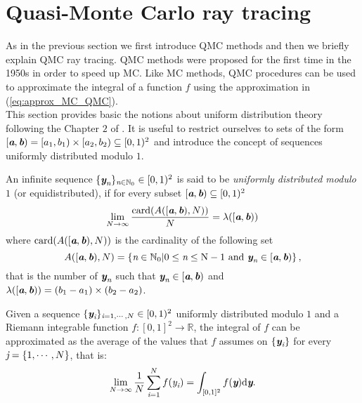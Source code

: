 \section{Quasi-Monte Carlo ray tracing}\label{sec:QMC}
As in the previous section we first introduce QMC methods and then we briefly explain QMC ray tracing. QMC methods were proposed for the first time in the 1950s in order to speed up MC. Like MC methods, QMC procedures can be used to approximate the integral of a function $f$ using the approximation in (\ref{eq:approx_MC_QMC}).\\ \indent
This section provides basic the notions about uniform distribution theory following the Chapter $2$ of \cite{leobacher2014introduction}. 
It is useful to restrict ourselves to sets of the form $[\textit{\textbf{a}}, \textit{\textbf{b}})= [a_1,b_1)\times[a_2, b_2)\subseteq[0,1)^2$ and introduce the concept of sequences uniformly distributed modulo $1$.
\begin{definition}
An infinite sequence $\{\textit{\textbf{y}}_{\textit{n}}\}_{\textit{n}\in\mathbb{N}_0} \in [0,1)^2$ is said to be \textit{uniformly distributed modulo $1$} (or equidistributed), if for every subset $[\textit{\textbf{a}},\textit{\textbf{b}})\subseteq[0,1)^2$
\begin{equation}
\lim_{N\rightarrow \infty}\frac{\textrm{card}(A([\textit{\textbf{a}},\textit{\textbf{b}}), N))}{N} = \lambda([\textit{\textbf{a}},\textit{\textbf{b}}))
\end{equation}
where $\textrm{card}(A([\textit{\textbf{a}},\textit{\textbf{b}}), N))$ is the cardinality of the following set
\begin{equation}
A([\textit{\textbf{a}},\textit{\textbf{b}}), N) = \{\textit{n}\in \mathbb{N}_0 | 0\leq\textit{n}\leq \textrm{N}-1 \mbox{ and } \textit{\textbf{y}}_{\textit{n}}\in [\textit{\textbf{a}},\textit{\textbf{b}})\}\,,
\end{equation} that is the number of $\textit{\textbf{y}}_{\textit{n}}$ such that $\textit{\textbf{y}}_{\textit{n}}\in [\textit{\textbf{a}},\textit{\textbf{b}})$ and $\lambda([\textit{\textbf{a}},\textit{\textbf{b}})) =(b_1-a_1)\times (b_2-a_2)$.
\end{definition}
Given a sequence $\{\textit{\textbf{y}}_{\textit{i}}\}_{\textit{i} = 1, \cdots, N}\in[0,1)^2$ uniformly distributed modulo $1$ and a 
Riemann integrable function $f:[0,1]^2\rightarrow \mathbb{R}$, the integral of $f$ can be approximated as the average of the values that $f$ assumes on $\{\textit{\textbf{y}}_{\textit{i}}\}$ for every $\textit{j}=\{1, \cdots, N\}$, that is:
\begin{equation}
 \lim_{N\rightarrow \infty}\frac{1}{N}\sum_{\textit{i}=1}^{N}f(\textit{y}_{\textit{i}}) = \int_{[0,1]^2}f(\textit{\textbf{y}})\textrm{d}\textit{\textbf{y}}.
\end{equation}
